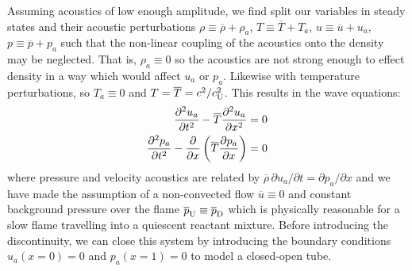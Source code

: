 Assuming acoustics of low enough amplitude, we find split our variables in steady states and their acoustic perturbations $ρ \equiv \overline{ρ} + ρ_a$, $T \equiv \overline{T} + T_a$, $u \equiv \overline{u} + u_a$, $p \equiv \overline{p} + p_a$ such that the non-linear coupling of the acoustics onto the density may be neglected. That is, $ρ_a \equiv 0$ so the acoustics are not strong enough to effect density in a way which would affect $u_a$ or $p_a$. Likewise with temperature perturbations, so $T_a \equiv 0$ and $T = \oT = c^2 / c_{\rm{U}}^2$. This results in the wave equations:
\begin{subequations} \label{eqn:wave_eqn}
\begin{align} 
\pdv[2]{u_a}{t} - \oT \pdv[2]{u_a}{x} &= 0 \label{eqn:wave_eqn_u} \\
\pdv[2]{p_a}{t} - \pdv{x} \left( \oT \pdv{p_a}{x} \right) &= 0 \label{eqn:wave_eqn_p}
\end{align}
\end{subequations}
where pressure and velocity acoustics are related by $\overline{ρ} \, \partial u_a / \partial t = \partial p_a / \partial x$ and we have made the assumption of a non-convected flow $\overline{u} \equiv 0$ and constant background pressure over the flame $\overline{p}_{\rm{U}} \equiv \overline{p}_{\rm{D}}$ which is physically reasonable for a slow flame travelling into a quiescent reactant mixture. Before introducing the discontinuity, we can close this system by introducing the boundary conditions $u_a(x = 0) = 0$ and $p_a(x = 1) = 0$ to model a closed-open tube.

